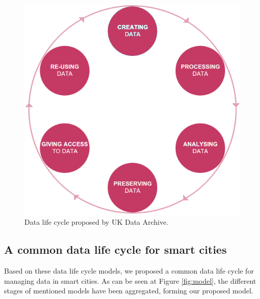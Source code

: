 \begin{figure}
    \center
    \includegraphics[scale=0.3]{img/data_lifecycle/uk-data-archive.png}
    \caption{Data life cycle proposed by UK Data Archive.}
    \label{fig:uk-data-archive}
\end{figure}

\subsection{A common data life cycle for smart cities}

Based on these data life cycle models, we proposed a common data life cycle for managing data in smart cities. As can be seen at Figure \ref{fig:model}, the different stages of mentioned models have been aggregated, forming our proposed model.

